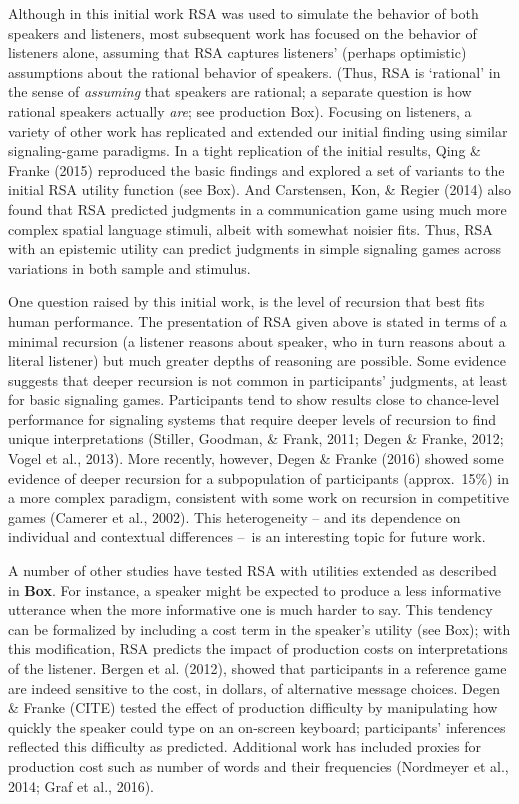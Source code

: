 \documentclass[]{elsarticle}
\begin{document}
Although in this initial work RSA was used to simulate the behavior of
both speakers and listeners, most subsequent work has focused on the
behavior of listeners alone, assuming that RSA captures listeners'
(perhaps optimistic) assumptions about the rational behavior of
speakers. (Thus, RSA is `rational' in the sense of \emph{assuming} that
speakers are rational; a separate question is how rational speakers
actually \emph{are}; see production Box). Focusing on listeners, a
variety of other work has replicated and extended our initial finding
using similar signaling-game paradigms. In a tight replication of the
initial results, Qing \& Franke (2015) reproduced the basic findings and
explored a set of variants to the initial RSA utility function (see
Box). And Carstensen, Kon, \& Regier (2014) also found that RSA
predicted judgments in a communication game using much more complex
spatial language stimuli, albeit with somewhat noisier fits. Thus, RSA
with an epistemic utility can predict judgments in simple signaling
games across variations in both sample and stimulus.

One question raised by this initial work, is the level of recursion that
best fits human performance. The presentation of RSA given above is
stated in terms of a minimal recursion (a listener reasons about
speaker, who in turn reasons about a literal listener) but much greater
depths of reasoning are possible. Some evidence suggests that deeper
recursion is not common in participants' judgments, at least for basic
signaling games. Participants tend to show results close to chance-level
performance for signaling systems that require deeper levels of
recursion to find unique interpretations (Stiller, Goodman, \& Frank,
2011; Degen \& Franke, 2012; Vogel et al., 2013). More recently,
however, Degen \& Franke (2016) showed some evidence of deeper recursion
for a subpopulation of participants (approx.~15\%) in a more
complex paradigm, consistent with some work on recursion in competitive
games (Camerer et al., 2002). This heterogeneity -- and its dependence
on individual and contextual differences --~is an interesting topic for
future work.

A number of other studies have tested RSA with utilities extended as
described in \textbf{Box}. For instance, a speaker might be expected to
produce a less informative utterance when the more informative one is
much harder to say. This tendency can be formalized by including a cost
term in the speaker's utility (see Box); with this modification, RSA
predicts the impact of production costs on interpretations of the
listener. Bergen et al. (2012), showed that participants in a reference
game are indeed sensitive to the cost, in dollars, of alternative
message choices. Degen \& Franke (CITE) tested the effect of production
difficulty by manipulating how quickly the speaker could type on an
on-screen keyboard; participants' inferences reflected this difficulty
as predicted. Additional work has included proxies for production cost
such as number of words and their frequencies (Nordmeyer et al., 2014;
Graf et al., 2016).
\end{document}
